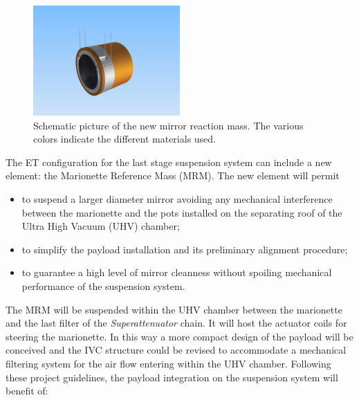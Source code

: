 \begin{figure}[htbp]
\begin{center}
\includegraphics[width=0.5\textwidth]{Sec_Suspensions/Figures/ET_RM.pdf}
\caption{\label{fig:RM} Schematic picture of the new mirror reaction mass. The various colors indicate the different materials used.}
\label{fig:ET_RM}
\end{center}
\end{figure}



The ET configuration for the last stage suspension system  can include a new element: the Marionette Reference Mass (MRM). The new element  will permit

\begin{itemize}
\item	to suspend a larger diameter mirror avoiding any mechanical interference between the marionette and the pots installed on the separating roof of the Ultra High Vacuum (UHV) chamber;
\item	to simplify the payload installation and its preliminary alignment procedure;
\item	to guarantee a high level of mirror cleanness without spoiling mechanical performance of the suspension system.
\end{itemize}

\noindent
The MRM will be suspended within the UHV chamber between the marionette and the last filter of the \emph{Superattenuator} chain. It will host the actuator coils for steering the marionette. In this way a more compact design of the payload will be conceived and the IVC structure could be revised to accommodate a mechanical filtering system for the air flow entering within the UHV chamber. 
Following these project guidelines, the payload integration on the suspension system will benefit of:  

